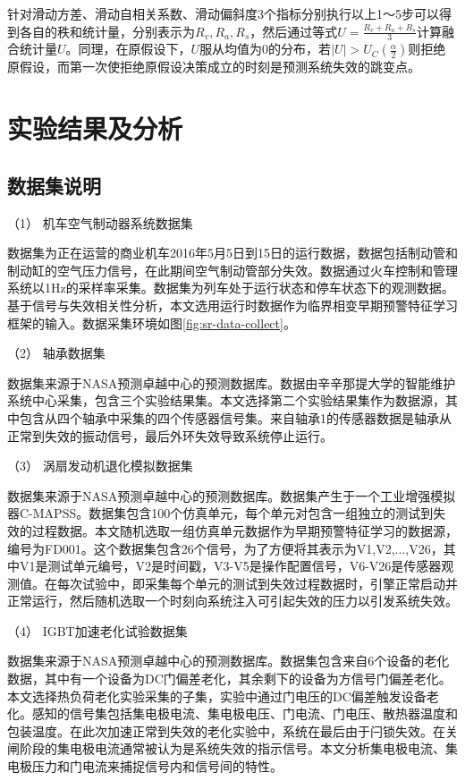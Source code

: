针对滑动方差、滑动自相关系数、滑动偏斜度3个指标分别执行以上1～5步可以得到各自的秩和统计量，分别表示为$R_{v}, R_{a}, R_{s}$，然后通过等式$U=\frac{R_{v} + R_{a} + R_{s}}{3}$计算融合统计量$U$。同理，在原假设下，$U$服从均值为0的分布，若$|U| > U_{C}(\frac{\alpha}{2})$则拒绝原假设，而第一次使拒绝原假设决策成立的时刻是预测系统失效的跳变点。

\section{实验结果及分析}
\label{sec:csd-experiment}

\subsection{数据集说明}
\label{sec:csd-dataset}	

（1） 机车空气制动器系统数据集

数据集为正在运营的商业机车2016年5月5日到15日的运行数据，数据包括制动管和制动缸的空气压力信号，在此期间空气制动管部分失效。数据通过火车控制和管理系统以1Hz的采样率采集。数据集为列车处于运行状态和停车状态下的观测数据。基于信号与失效相关性分析，本文选用运行时数据作为临界相变早期预警特征学习框架的输入。数据采集环境如图\ref{fig:sr-data-collect}。

（2） 轴承数据集

数据集来源于NASA预测卓越中心的预测数据库\cite{nasa2018}。数据由辛辛那提大学的智能维护系统中心采集，包含三个实验结果集。本文选择第二个实验结果集作为数据源，其中包含从四个轴承中采集的四个传感器信号集。来自轴承1的传感器数据是轴承从正常到失效的振动信号，最后外环失效导致系统停止运行。

（3） 涡扇发动机退化模拟数据集

数据集来源于NASA预测卓越中心的预测数据库\cite{nasa2018}。数据集产生于一个工业增强模拟器C-MAPSS。数据集包含100个仿真单元，每个单元对包含一组独立的测试到失效的过程数据。本文随机选取一组仿真单元数据作为早期预警特征学习的数据源，编号为FD001。这个数据集包含26个信号，为了方便将其表示为V1,V2,...,V26，其中V1是测试单元编号，V2是时间戳，V3-V5是操作配置信号，V6-V26是传感器观测值。在每次试验中，即采集每个单元的测试到失效过程数据时，引擎正常启动并正常运行，然后随机选取一个时刻向系统注入可引起失效的压力以引发系统失效。

（4） IGBT加速老化试验数据集

数据集来源于NASA预测卓越中心的预测数据库\cite{nasa2018}。数据集包含来自6个设备的老化数据，其中有一个设备为DC门偏差老化，其余剩下的设备为方信号门偏差老化。本文选择热负荷老化实验采集的子集，实验中通过门电压的DC偏差触发设备老化。感知的信号集包括集电极电流、集电极电压、门电流、门电压、散热器温度和包装温度。在此次加速正常到失效的老化实验中，系统在最后由于闩锁失效。在关闸阶段的集电极电流通常被认为是系统失效的指示信号。本文分析集电极电流、集电极压力和门电流来捕捉信号内和信号间的特性。

